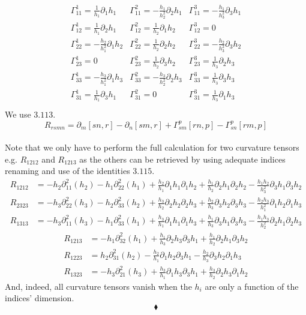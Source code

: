 \begin{align*}
\begin{array}{lll}
\Gamma^1_{11}=\frac{1}{h_{1}}\partial_{1}{h_{1}} &\Gamma^2_{11}=-\frac{h_{1}}{h_{2}^2}\partial_{2}{h_{1}}  & \Gamma^3_{11}= -\frac{h_{1}}{h_{3}^2}\partial_{3}{h_{1}}   \\
\Gamma^1_{12}= \frac{1}{h_{1}}\partial_{2}{h_{1}} &\Gamma^2_{12}=\frac{1}{h_{2}}\partial_{1}{h_{2}} & \Gamma^3_{12}=0\\
\Gamma^1_{22}= -\frac{h_{2}}{h_{1}^2}\partial_{1}{h_{2}} &\Gamma^2_{22}=\frac{1}{h_{2}}\partial_{2}{h_{2}} & \Gamma^3_{22}=-\frac{h_{2}}{h_{3}^2}\partial_{3}{h_{2}} \\
\Gamma^1_{23}=0 &\Gamma^2_{23}=\frac{1}{h_{2}}\partial_{3}{h_{2}} & \Gamma^3_{23}= \frac{1}{h_{3}}\partial_{2}{h_{3}}\\
\Gamma^1_{33}= -\frac{h_{3}}{h_{1}^2}\partial_{1}{h_{3}}&\Gamma^2_{33}=-\frac{h_{3}}{h_{2}^2}\partial_{2}{h_{3}} & \Gamma^3_{33}= \frac{1}{h_{3}}\partial_{3}{h_{3}}\\
\Gamma^1_{31}=\frac{1}{h_{1}}\partial_{3}{h_{1}} &\Gamma^2_{31}=0 & \Gamma^3_{31}=\frac{1}{h_{3}}\partial_{1}{h_{3}} \\
\end{array}
\end{align*}
We use $3.113.$ $$R_{rsmn}= \partial_m[sn,r] -\partial_n[sm,r]+\Gamma^p_{sm}[rn,p]-\Gamma^p_{sn}[rm,p]$$\\

Note that we only have to perform the full calculation for two curvature tensors e.g. $R_{1212}$ and $R_{1213}$  as the others can be retrieved by using adequate indices renaming and use of the identities $3.115.$
\begin{align*}
R_{1212}&=
-h_2\partial_{11}^2(h_2)-h_1\partial_{22}^2(h_1)
+\frac{h_2}{h_1}\partial_1 h_1\partial_1 h_2+\frac{h_1}{h_2}\partial_2 h_1\partial_2 h_2-\frac{h_1 h_2}{h_3^2}\partial_3 h_1\partial_3 h_2\\
R_{2323}&=
-h_3\partial_{22}^2(h_3)-h_2\partial_{33}^2(h_2)
+\frac{h_3}{h_2}\partial_2 h_2\partial_2 h_3+\frac{h_2}{h_3}\partial_3 h_2\partial_3 h_3-\frac{h_2 h_3}{h_1^2}\partial_1 h_2\partial_1 h_3\\
R_{1313}&=
-h_3\partial_{11}^2(h_3)-h_1\partial_{33}^2(h_1)
+\frac{h_3}{h_1}\partial_1 h_1\partial_1 h_3+\frac{h_1}{h_3}\partial_3 h_1\partial_3 h_3-\frac{h_1 h_3}{h_2^2}\partial_2 h_1\partial_2 h_3
\end{align*}
\begin{align*}
R_{1213}&=-h_1\partial_{32}^2(h_1)+\frac{h_1}{h_3}\partial_2 h_3\partial_3 h_1+\frac{h_1}{h_2}\partial_2 h_1\partial_3 h_2\\
R_{1223}&=h_2\partial_{31}^2(h_2)-\frac{h_2}{h_1}\partial_1 h_2\partial_3 h_1-\frac{h_2}{h_3}\partial_3 h_2\partial_1 h_3\\
R_{1323}&=
-h_3\partial_{21}^2(h_3)+\frac{h_3}{h_1}\partial_1 h_3\partial_3 h_1+\frac{h_3}{h_2}\partial_2 h_3\partial_1 h_2
\end{align*}
And, indeed, all curvature tensors vanish when the $h_i$ are only a function of the indices' dimension.
$$\blacklozenge$$
\newpage


